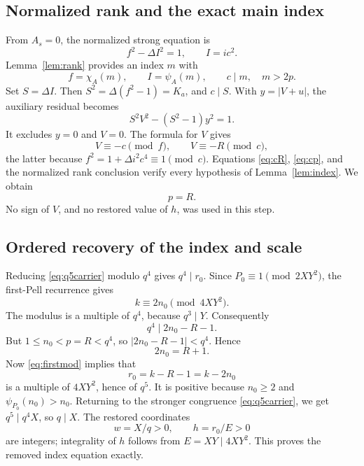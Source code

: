 \documentclass[11pt,a4paper]{article}
\theoremstyle{definition}
\theoremstyle{remark}
\begin{document}
\subsection{Normalized rank and the exact main index}

From \(A_s=0\), the normalized strong equation is
\[
 f^2-\Delta I^2=1,\qquad I=ic^2.
\]
Lemma~\ref{lem:rank} provides an index \(m\) with
\[
 f=\chi_A(m),\qquad I=\psi_A(m),\qquad
 c\mid m,\quad m>2p.
\]
Set \(S=\Delta I\). Then \(S^2=\Delta(f^2-1)=K_a\), and \(c\mid S\).
With \(y=|V+u|\), the auxiliary residual becomes
\begin{equation}
 S^2V^2-(S^2-1)y^2=1.                       \label{eq:auxrecover13}
\end{equation}
It excludes \(y=0\) and \(V=0\). The formula for \(V\) gives
\[
 V\equiv-c\pmod f,\qquad
 V\equiv-R\pmod c,
\]
the latter because \(f^2=1+\Delta i^2c^4\equiv1\pmod c\).
Equations \eqref{eq:cR}, \eqref{eq:cp}, and the normalized rank conclusion
verify every hypothesis of Lemma~\ref{lem:index}. We obtain
\begin{equation}
 p=R.                                       \label{eq:exactp}
\end{equation}
No sign of \(V\), and no restored value of \(h\), was used in this step.

\subsection{Ordered recovery of the index and scale}

Reducing \eqref{eq:q5carrier} modulo \(q^4\) gives \(q^4\mid r_0\).
Since \(P_0\equiv1\pmod{2XY^2}\), the first-Pell recurrence gives
\begin{equation}
 k\equiv2n_0\pmod{4XY^2}.                   \label{eq:firstmod}
\end{equation}
The modulus is a multiple of \(q^4\), because \(q^3\mid Y\).
Consequently
\[
 q^4\mid2n_0-R-1.
\]
But \(1\le n_0<p=R<q^4\), so
\(|2n_0-R-1|<q^4\). Hence
\begin{equation}
 2n_0=R+1.                                 \label{eq:exactn}
\end{equation}
Now \eqref{eq:firstmod} implies that
\[
 r_0=k-R-1=k-2n_0
\]
is a multiple of \(4XY^2\), hence of \(q^5\).
It is positive because \(n_0\ge2\) and
\(\psi_{P_0}(n_0)>n_0\).
Returning to the stronger congruence \eqref{eq:q5carrier}, we get
\(q^5\mid q^4X\), so \(q\mid X\).
The restored coordinates
\begin{equation}
 w=X/q>0,\qquad h=r_0/E>0                  \label{eq:restorewh}
\end{equation}
are integers; integrality of \(h\) follows from \(E=XY\mid4XY^2\).
This proves the removed index equation exactly.
\end{document}
